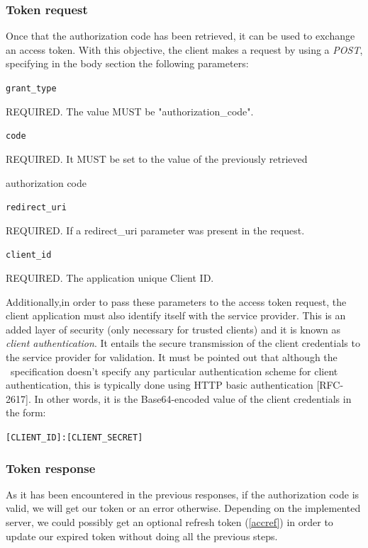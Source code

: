 \subsubsection{Token request}
Once that the authorization code has been retrieved, it can be used to exchange an access token. With this objective, the client makes a request by using a \textit{POST}, specifying in the body section the following parameters:

\texttt{grant\_type}

\hspace{0.5cm}REQUIRED. The value MUST be "authorization\_code".

\texttt{code}

\hspace{0.5cm}REQUIRED. It MUST be set to the value of the previously retrieved

\hspace{0.5cm}authorization code

\texttt{redirect\_uri}

\hspace{0.5cm}REQUIRED. If a redirect\_uri parameter was present in the request.

\texttt{client\_id}

\hspace{0.5cm}REQUIRED. The application unique Client ID.

\vspace{0.5cm}

Additionally,in order to pass these parameters to the access token request, the client
application must also identify itself with the service provider. This is an added
layer of security (only necessary for trusted clients) and it is known as \textit{client
authentication}.
It entails the secure transmission of the client credentials to the service provider for validation. It must be pointed out that although the \oauth\ specification doesn't specify any particular authentication scheme for client authentication, this is typically done using HTTP basic authentication [RFC-2617].
In other words, it is the Base64-encoded value of the client credentials in
the form:

\hspace{0.5cm}\texttt{[CLIENT\_ID]:[CLIENT\_SECRET]}

\subsubsection{Token response}
As it has been encountered in the previous responses, if the authorization code is valid, we will get our token or an error otherwise. Depending on the implemented server, we could possibly get an optional refresh token (\ref{accref}) in order to update our expired token without doing all the previous steps.

